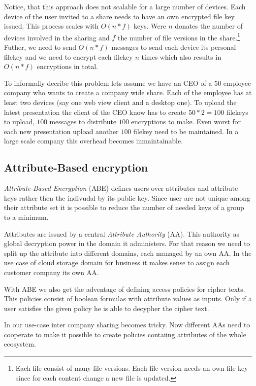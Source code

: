 Notice, that this approach does not scalable for a large number of devices. Each device of the user invited to a share needs to have an own encrypted file key issued. This process scales with $O(n * f)$ keys. Were $n$ donates the number of devices involved in the sharing and $f$ the number of file versions in the share.\footnote{Each file consist of many file versions. Each file version needs an own file key since for each content change a new file is updated.} Futher, we need to send $O(n * f)$ messages to send each device its personal filekey and we need to encrypt each filekey $n$ times which also results in $O(n * f)$ encryptions in total. 

To informally decribe this problem lets assume we have an CEO of a 50 employee company who wants to create a company wide share. Each of the employee has at least two devices (say one web view client and a desktop one). To upload the latest presentation the client of the CEO know has to create $50 * 2 = 100$ filekeys to upload, $100$ messages to distribute $100$ encryptions to make. Even worst for each new presentation upload another $100$ filekey need to be maintained. In a large scale company this overhead becomes inmaintainable.

\subsection{Attribute-Based encryption}
\textit{Attribute-Based Encryption} (\ac{ABE}) defines users over attributes and attribute keys rather then the indivudal by its public key. Since user are not unique among their attribute set it is possible to reduce the number of needed keys of a group to a minimum. 

Attributes are issued by a central \textit{Attribute Authority} (\ac{AA}). This authority as global decryption power in the domain it administers. For that reason we need to split up the attribute into different domains, each managed by an own AA. In the use case of cloud storage domain for business it makes sense to assign each customer company its own AA.

With ABE we also get the adventage of defining access policies for cipher texts. This policies consist of boolean formulas with attribute values as inputs. Only if a user satisfies the given policy he is able to decypher the cipher text.

In our use-case inter company sharing becomes tricky. Now different AAs need to cooperate to make it possible to create policies contaiing attributes of the whole ecosystem.  

